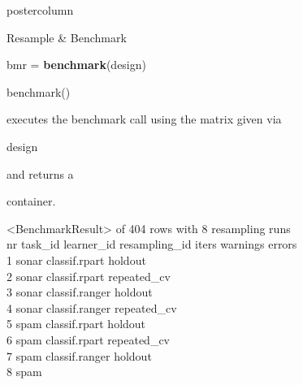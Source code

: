 \documentclass{beamer}
\newcommand{\codeinline}[1]{\begin{codeboxinline}#1\end{codeboxinline}}
\begin{document}
\begin{frame}[fragile]{}
\begin{columns}
\begin{column}{.245\textwidth}
\begin{beamercolorbox}[center]{postercolumn}
\begin{minipage}{.98\textwidth}
{\begin{myblock}{Resample \& Benchmark}
							\begin{codebox}
								bmr = \textbf{benchmark}(design)
							\end{codebox}
							\codeinline{benchmark()} executes the benchmark call
							using the matrix given via \codeinline{design} and
							returns a \codeinline{}
							container.
							\begin{codeboxmultiline}[width=27cm]
								\scriptsize{
								<BenchmarkResult> of 404 rows with 8 resampling runs\\
								nr task\_id \space\space\space\space learner\_id resampling\_id iters warnings errors\\
								1 \space\space\space sonar \space classif.rpart
								\space\space\space\space\space\space holdout
								\space\space\space\space 1
								\space\space\space\space\space\space\space 0
								\space\space\space\space\space 0\\
								2 \space\space\space sonar \space classif.rpart
								\space\space repeated\_cv
								\space{}00
								\space\space\space\space\space\space{}
								\space\space\space\space{}\\
								3 \space\space\space sonar classif.ranger
								\space\space\space\space\space\space holdout
								\space\space\space\space 1
								\space\space\space\space\space\space\space 0
								\space\space\space\space\space 0\\
								4 \space\space\space sonar classif.ranger
								\space\space repeated\_cv
								\space{}
								\space\space\space\space\space\space{}
								\space\space\space\space{}\\
								5 \space\space\space\space spam
								\space classif.rpart
								\space\space\space\space\space\space holdout
								\space\space\space{}
								\space\space\space\space\space\space{}
								\space\space\space\space{}\\
								6 \space\space\space\space spam
								\space  classif.rpart
								\space\space repeated\_cv
								\space{}
								\space\space\space\space\space\space{}
								\space\space\space\space{}\\
								7 \space\space\space\space spam
								classif.ranger
								\space\space\space\space\space\space holdout
								\space\space\space{}
								\space\space\space\space\space\space{}
								\space\space\space\space{}\\
								8 \space\space\space\space spam
}
\end{codeboxmultiline}
\end{myblock}}
\end{minipage}
\end{beamercolorbox}
\end{column}
\end{columns}
\end{frame}
\end{document}
